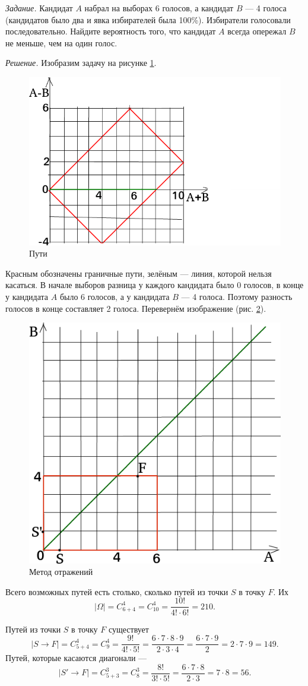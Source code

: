 \textit{Задание.} Кандидат $A$ набрал на выборах 6 голосов, а кандидат $B$ --- 4 голоса (кандидатов было два и явка избирателей была 100\%).
Избиратели голосовали последовательно.
Найдите вероятность того, что кандидат $A$ всегда опережал $B$ не меньше, чем на один голос.

\textit{Решение.} Изобразим задачу на рисунке \ref{fig:23}.

\begin{figure}[h!]
  \centering
  \includegraphics[width=.4\textwidth]{./pictures/t1v2_3.png}
  \caption{Пути}
  \label{fig:23}
\end{figure}

Красным обозначены граничные пути, зелёным --- линия, которой нельзя касаться.
В начале выборов разница у каждого кандидата было 0 голосов, в конце у кандидата $A$ было 6 голосов, а у кандидата $B$ --- 4 голоса.
Поэтому разность голосов в конце составляет 2 голоса.
Перевернём изображение (рис. \ref{fig:231}).

\begin{figure}[h!]
  \centering
  \includegraphics[width=.4\textwidth]{./pictures/t1v2_31.png}
  \caption{Метод отражений}
  \label{fig:231}
\end{figure}

Всего возможных путей есть столько, сколько путей из точки $S$ в точку $F$.
Их
$$ \left| \Omega \right| =
C_{6+4}^4 =
C_{10}^4 =
\frac{10!}{4! \cdot 6!} =
210.$$

Путей из точки $S$ в точку $F$ существует
$$ \left| S \rightarrow F \right| =
C_{5+4}^4 =
C_9^4 =
\frac{9!}{4! \cdot 5!} =
\frac{6 \cdot 7 \cdot 8 \cdot 9}{2 \cdot 3 \cdot 4} =
\frac{6 \cdot 7 \cdot 9}{2} =
2 \cdot 7 \cdot 9 =
149.$$
Путей, которые касаются диагонали ---
$$ \left| S' \rightarrow F \right| =
C_{5+3}^3 =
C_8^3 =
\frac{8!}{3! \cdot 5!} =
\frac{6 \cdot 7 \cdot 8}{2 \cdot 3} =
7 \cdot 8 =
56.$$

